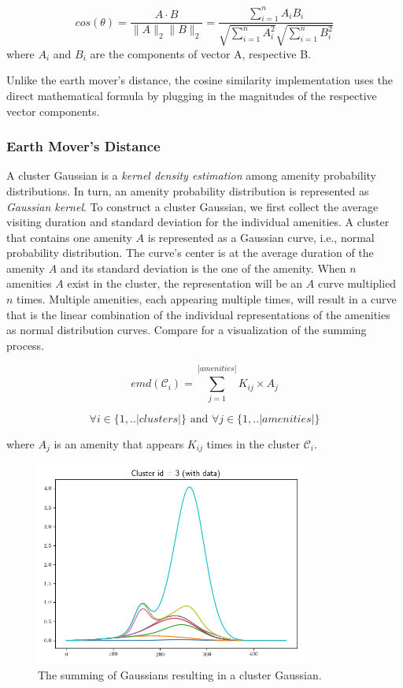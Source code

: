 \begin{equation}
cos(\theta)=\frac{A\cdot B}{{\lVert}A{\rVert}       
	_2{\lVert}B{\rVert}_2}=\frac{\sum_{i=1}^n{A_iB_i}}{\sqrt{\sum_{i=1}^n{A_i^2}}\sqrt{\sum_{i=1}^n{B_i^2}}}
\end{equation}
where $A_i$ and $B_i$ are the components of vector A, respective B. 

Unlike the earth mover's distance, the cosine similarity implementation uses the direct mathematical formula by plugging in the magnitudes of the respective vector components.

\subsubsection{Earth Mover's Distance}
\label{realization:gaussians}

A cluster Gaussian is a \textit{kernel density estimation} among amenity probability distributions.
In turn, an amenity probability distribution is represented as \textit{Gaussian kernel}.
To construct a cluster Gaussian, we first collect the average visiting duration and standard deviation for the individual amenities.
A cluster that contains one amenity $A$ is represented as a Gaussian curve, i.e., normal probability distribution.
The curve's center is at the average duration of the amenity $A$ and its standard deviation is the one of the amenity.
When $n$ amenities $A$ exist in the cluster, the representation will be an $A$ curve multiplied $n$ times.
Multiple amenities, each appearing multiple times, will result in a curve that is the linear combination of the individual representations of the amenities as normal distribution curves.
Compare  for a visualization of the summing process.

\begin{equation}
emd(\mathcal{C}_i) = \sum_{j=1}^{|amenities|} K_{ij} \times A_j
\end{equation}

$$\forall i \in \{1,..|clusters|\} \text{ and } \forall j \in \{1,..|amenities|\}$$

where $A_j$ is an amenity that appears $K_{ij}$ times in the cluster $\mathcal{C}_i$.

\begin{figure}[!ht]
	\centering
	\includegraphics[width=0.8\textwidth]{graphics/emd_gaussian_addition3.png}
	\caption{The summing of Gaussians resulting in a cluster Gaussian.}
	\label{fig:gaussian}
\end{figure}

